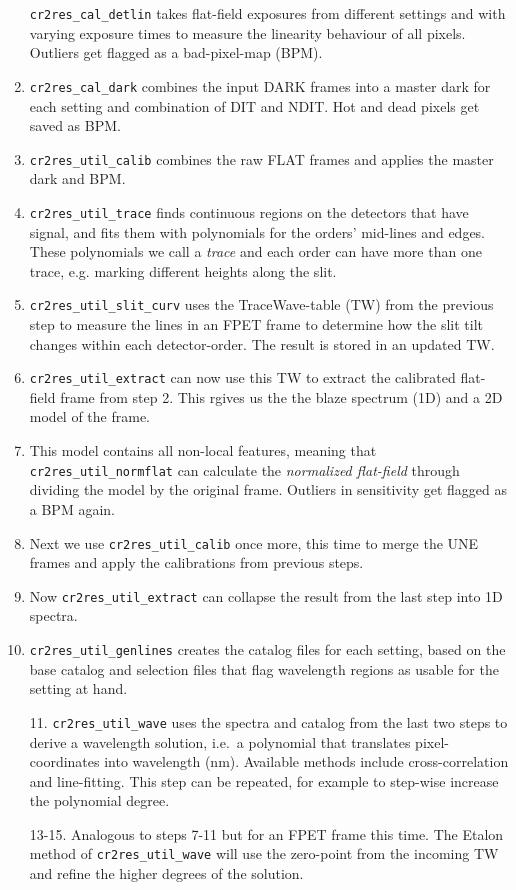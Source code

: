 \begin{enumerate}
    \item[] \texttt{cr2res\_cal\_detlin} takes flat-field exposures from
    different settings and with varying exposure times to measure the linearity
    behaviour of all pixels. Outliers get flagged as a bad-pixel-map (BPM).
    \item \texttt{cr2res\_cal\_dark} combines the input DARK frames into a
    master dark for each setting and combination of DIT and NDIT. Hot and dead
    pixels get saved as BPM.
    \item \texttt{cr2res\_util\_calib} combines the raw FLAT frames and applies
    the	master dark and BPM.
    \item \texttt{cr2res\_util\_trace} finds continuous regions on the detectors
    that have signal, and fits them with polynomials for the orders' mid-lines
    and edges. These polynomials we call a \emph{trace} and each order can have
    more than one trace, e.g. marking different heights along the slit.
    \item \texttt{cr2res\_util\_slit\_curv} uses the TraceWave-table (TW) from
    the previous step to measure the lines in an FPET frame to determine
    how the slit tilt changes within each detector-order. The result is stored
    in an updated TW.
    \item \texttt{cr2res\_util\_extract} can now use this TW to extract the
    calibrated flat-field frame from step 2. This rgives us the the blaze
    spectrum (1D) and a 2D model of the frame.
    \item This model contains all non-local features, meaning that
    \texttt{cr2res\_util\_normflat} can calculate the \emph{normalized
    flat-field} through dividing the model by the original frame. Outliers in
    sensitivity get flagged as a BPM again.
    \item Next we use \texttt{cr2res\_util\_calib} once more, this time to merge the UNE frames and apply the calibrations from previous steps.
    \item Now \texttt{cr2res\_util\_extract} can collapse the result from the last step into 1D spectra.
    \item \texttt{cr2res\_util\_genlines} creates the catalog files for each
    setting, based on the base catalog and selection files that flag wavelength
    regions as usable for the setting at hand.
    \item[11.] \texttt{cr2res\_util\_wave} uses the spectra and catalog from the
    last two steps to derive a wavelength solution, i.e.~a polynomial
    that translates pixel-coordinates into wavelength (nm). Available methods
    include cross-correlation and line-fitting. This step can be repeated, for
    example to step-wise increase the polynomial degree.
    \item[13-15.] Analogous to steps 7-11 but for an FPET frame this time. The
    Etalon method of \texttt{cr2res\_util\_wave} will use the zero-point from
    the incoming TW and refine the higher degrees of the solution.
\end{enumerate}
